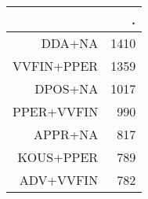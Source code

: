 \begin{tabular}{rr}
  \hline
 & . \\ 
  \hline
DDA+NA & 1410 \\ 
  VVFIN+PPER & 1359 \\ 
  DPOS+NA & 1017 \\ 
  PPER+VVFIN & 990 \\ 
  APPR+NA & 817 \\ 
  KOUS+PPER & 789 \\ 
  ADV+VVFIN & 782 \\ 
   \hline
\end{tabular}
